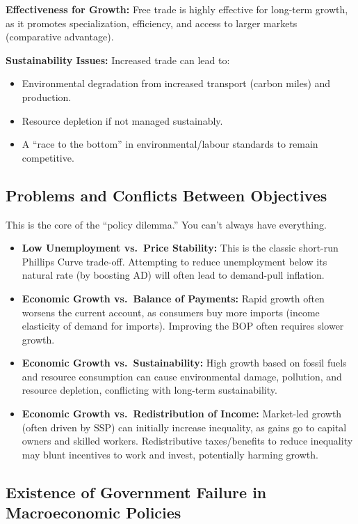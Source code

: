 \documentclass[11pt, a4paper, twoside]{book}
\begin{document}
\textbf{Effectiveness for Growth:} Free trade is highly effective for long-term growth, as it promotes specialization, efficiency, and access to larger markets (comparative advantage).

\textbf{Sustainability Issues:} Increased trade can lead to:
\begin{itemize}
  \item Environmental degradation from increased transport (carbon miles) and production.
  \item Resource depletion if not managed sustainably.
  \item A ``race to the bottom'' in environmental/labour standards to remain competitive.
\end{itemize}

\subsection{Problems and Conflicts Between Objectives}

This is the core of the ``policy dilemma.'' You can't always have everything.

\begin{itemize}
  \item \textbf{Low Unemployment vs.\ Price Stability:} This is the classic short-run Phillips Curve trade-off. Attempting to reduce unemployment below its natural rate (by boosting AD) will often lead to demand-pull inflation.
  \item \textbf{Economic Growth vs.\ Balance of Payments:} Rapid growth often worsens the current account, as consumers buy more imports (income elasticity of demand for imports). Improving the BOP often requires slower growth.
  \item \textbf{Economic Growth vs.\ Sustainability:} High growth based on fossil fuels and resource consumption can cause environmental damage, pollution, and resource depletion, conflicting with long-term sustainability.
  \item \textbf{Economic Growth vs.\ Redistribution of Income:} Market-led growth (often driven by SSP) can initially increase inequality, as gains go to capital owners and skilled workers. Redistributive taxes/benefits to reduce inequality may blunt incentives to work and invest, potentially harming growth.
\end{itemize}

\subsection{Existence of Government Failure in Macroeconomic Policies}
\end{document}
